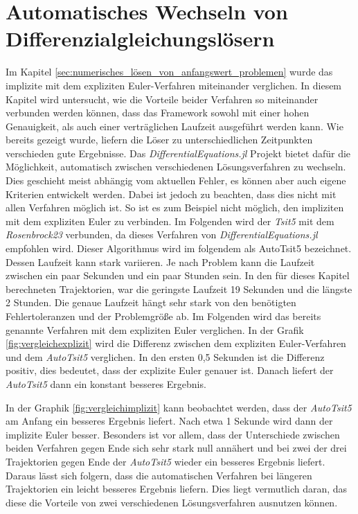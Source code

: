 

\section{Automatisches Wechseln von Differenzialgleichungslösern}

Im Kapitel \ref{sec:numerisches_lösen_von_anfangswert_problemen} wurde das implizite mit dem expliziten Euler-Verfahren miteinander verglichen.
In diesem Kapitel wird untersucht, wie die Vorteile beider Verfahren so miteinander verbunden 
werden können, dass das Framework sowohl mit einer hohen Genauigkeit, als auch einer verträglichen Laufzeit
ausgeführt werden kann.
Wie bereits gezeigt wurde, liefern die Löser zu unterschiedlichen Zeitpunkten
verschieden gute Ergebnisse.
Das \textit{DifferentialEquations.jl} \cite{DifferentialEquations.jl-2017} Projekt bietet dafür die Möglichkeit, automatisch 
zwischen verschiedenen Lösungsverfahren zu wechseln.
Dies geschieht meist abhängig vom aktuellen Fehler, es können aber auch eigene Kriterien entwickelt werden.
Dabei ist jedoch zu beachten, dass dies nicht mit allen Verfahren möglich ist.
So ist es zum Beispiel nicht möglich, den impliziten mit dem expliziten Euler zu verbinden.
Im Folgenden wird der \textit{Tsit5} mit dem \textit{Rosenbrock23} verbunden, da dieses Verfahren von \textit{DifferentialEquations.jl} empfohlen wird. Dieser Algorithmus wird im folgendem als AutoTsit5 bezeichnet.
Dessen Laufzeit kann stark variieren. Je nach Problem kann die Laufzeit zwischen ein paar Sekunden und
ein paar Stunden sein.
In den für dieses Kapitel berechneten Trajektorien, war die geringste Laufzeit 19 Sekunden und die längste 2 Stunden.
Die genaue Laufzeit hängt sehr stark von den benötigten Fehlertoleranzen und der Problemgröße ab.
Im Folgenden wird das bereits genannte Verfahren mit dem expliziten Euler verglichen.
In der Grafik \ref{fig:vergleichexplizit} wird die Differenz zwischen dem expliziten Euler-Verfahren und dem \textit{AutoTsit5} verglichen.
In den ersten 0,5 Sekunden ist die Differenz positiv, dies bedeutet, dass
der explizite Euler genauer ist.
Danach liefert der \textit{AutoTsit5} dann ein konstant besseres Ergebnis.

In der Graphik \ref{fig:vergleichimplizit} kann beobachtet werden,
dass der \textit{AutoTsit5} am Anfang ein besseres Ergebnis liefert.
Nach etwa 1 Sekunde wird dann der implizite Euler besser.
Besonders ist vor allem, dass der Unterschiede zwischen beiden Verfahren gegen Ende sich sehr stark null annähert und bei zwei der drei Trajektorien gegen Ende  der \textit{AutoTsit5} wieder ein besseres Ergebnis liefert.
Daraus lässt sich folgern, dass die automatischen Verfahren bei längeren Trajektorien ein leicht besseres Ergebnis liefern.
Dies liegt vermutlich daran, das diese die Vorteile von 
zwei verschiedenen Lösungsverfahren ausnutzen können.

